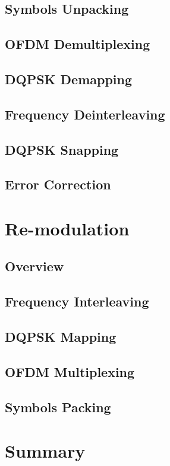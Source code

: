 \documentclass[class=report,11pt,crop=false]{standalone}
\begin{document}
\subsection{Symbols Unpacking}
\subsection{OFDM Demultiplexing}
\subsection{DQPSK Demapping}
\subsection{Frequency Deinterleaving}
\subsection{DQPSK Snapping}
\subsection{Error Correction}

\section{Re-modulation}
\subsection{Overview}
\subsection{Frequency Interleaving}
\subsection{DQPSK Mapping}
\subsection{OFDM Multiplexing}
\subsection{Symbols Packing}

\section{Summary}

\ifstandalone

\printnoidxglossary[type=\acronymtype,nonumberlist]
\fi
\end{document}

